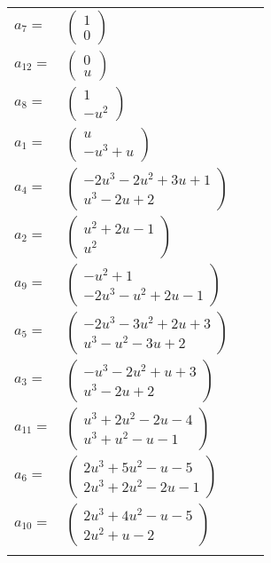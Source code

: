 \documentclass[1p]{elsarticle_modified}
\theoremstyle{definition}
\begin{document}
\begin{tabular}{m{7pt} m{180pt} m{7pt} m{180pt} }
\flushright $a_{7}=$&$\begin{pmatrix}1\\0\end{pmatrix}$ \\
\flushright $a_{12}=$&$\begin{pmatrix}0\\u\end{pmatrix}$ \\
\flushright $a_{8}=$&$\begin{pmatrix}1\\- u^2\end{pmatrix}$ \\
\flushright $a_{1}=$&$\begin{pmatrix}u\\- u^3+u\end{pmatrix}$ \\
\flushright $a_{4}=$&$\begin{pmatrix}-2 u^3-2 u^2+3 u+1\\u^3-2 u+2\end{pmatrix}$ \\
\flushright $a_{2}=$&$\begin{pmatrix}u^2+2 u-1\\u^2\end{pmatrix}$ \\
\flushright $a_{9}=$&$\begin{pmatrix}- u^2+1\\-2 u^3- u^2+2 u-1\end{pmatrix}$ \\
\flushright $a_{5}=$&$\begin{pmatrix}-2 u^3-3 u^2+2 u+3\\u^3- u^2-3 u+2\end{pmatrix}$ \\
\flushright $a_{3}=$&$\begin{pmatrix}- u^3-2 u^2+u+3\\u^3-2 u+2\end{pmatrix}$ \\
\flushright $a_{11}=$&$\begin{pmatrix}u^3+2 u^2-2 u-4\\u^3+u^2- u-1\end{pmatrix}$ \\
\flushright $a_{6}=$&$\begin{pmatrix}2 u^3+5 u^2- u-5\\2 u^3+2 u^2-2 u-1\end{pmatrix}$ \\
\flushright $a_{10}=$&$\begin{pmatrix}2 u^3+4 u^2- u-5\\2 u^2+u-2\end{pmatrix}$\\&\end{tabular}
\end{document}
